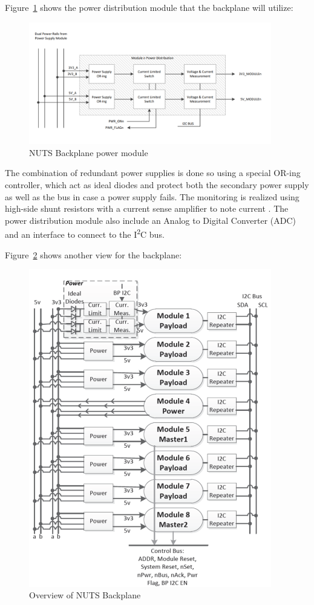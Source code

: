 \documentclass[12pt, a4paper]{report}
\begin{document}
Figure~\ref{fig:nuts_backplane} shows the power distribution module that the backplane will utilize:

\begin{figure}[H]
    \centering
    \includegraphics[width=300pt]{images/nuts_backplane2.PNG}
    \caption{NUTS Backplane power module \cite{power_distribution}}
    \label{fig:nuts_backplane}
\end{figure}

The combination of redundant power supplies is done so using a special OR-ing controller, which act as ideal diodes and protect both the secondary power supply as well as the bus in case a power supply fails. The monitoring is realized using high-side shunt resistors with a current sense amplifier to note current \cite{power_distribution}. The power distribution module also include an Analog to Digital Converter (ADC) and an interface to connect to the I\textsuperscript{2}C bus.

Figure~\ref{fig:nuts_backplane_2} shows another view for the backplane:

\begin{figure}[H]
    \centering
    \includegraphics[width=300pt]{images/nuts_backplane.PNG}
    \caption{Overview of NUTS Backplane \cite{overview}}
    \label{fig:nuts_backplane_2}
\end{figure}
\end{document}
